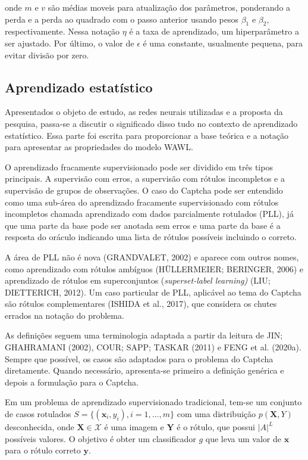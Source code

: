 \documentclass[12pt,twoside,brazilian]{book}
\begin{document}
onde \(m\) e \(v\) são médias moveis para atualização dos parâmetros,
ponderando a perda e a perda ao quadrado com o passo anterior usando
pesos \(\beta_1\) e \(\beta_2\), respectivamente. Nessa notação \(\eta\)
é a taxa de aprendizado, um hiperparâmetro a ser ajustado. Por último, o
valor de \(\epsilon\) é uma constante, usualmente pequena, para evitar
divisão por zero.

\hypertarget{aprendizado-estatuxedstico}{%
\subsection{Aprendizado estatístico}\label{aprendizado-estatuxedstico}}

Apresentados o objeto de estudo, as redes neurais utilizadas e a
proposta da pesquisa, passa-se a discutir o significado disso tudo no
contexto de aprendizado estatístico. Essa parte foi escrita para
proporcionar a base teórica e a notação para apresentar as propriedades
do modelo WAWL.

O aprendizado fracamente supervisionado pode ser dividido em três tipos
principais. A supervisão com erros, a supervisão com rótulos incompletos
e a supervisão de grupos de observações. O caso do Captcha pode ser
entendido como uma sub-área do aprendizado fracamente supervisionado com
rótulos incompletos chamada aprendizado com dados parcialmente rotulados
(PLL), já que uma parte da base pode ser anotada sem erros e uma parte
da base é a resposta do oráculo indicando uma lista de rótulos possíveis
incluindo o correto.

A área de PLL não é nova (GRANDVALET, 2002) e aparece com outros nomes,
como aprendizado com rótulos ambíguos (HÜLLERMEIER; BERINGER, 2006) e
aprendizado de rótulos em superconjuntos (\emph{superset-label
learning)} (LIU; DIETTERICH, 2012). Um caso particular de PLL, aplicável
ao tema do Captcha são rótulos complementares (ISHIDA et al., 2017), que
considera os chutes errados na notação do problema.

As definições seguem uma terminologia adaptada a partir da leitura de
JIN; GHAHRAMANI (2002), COUR; SAPP; TASKAR (2011) e FENG et al. (2020a).
Sempre que possível, os casos são adaptados para o problema do Captcha
diretamente. Quando necessário, apresenta-se primeiro a definição
genérica e depois a formulação para o Captcha.

Em um problema de aprendizado supervisionado tradicional, tem-se um
conjunto de casos rotulados \(S=\{(\mathbf x_i,y_i), i=1,\dots, m\}\)
com uma distribuição \(p(\mathbf X,Y)\) desconhecida, onde
\(\mathbf X\in \mathcal X\) é uma imagem e \(\mathbf Y\) é o rótulo, que
possui \(|A|^L\) possíveis valores. O objetivo é obter um classificador
\(g\) que leva um valor de \(\mathbf x\) para o rótulo correto
\(\mathbf y\).
\end{document}
